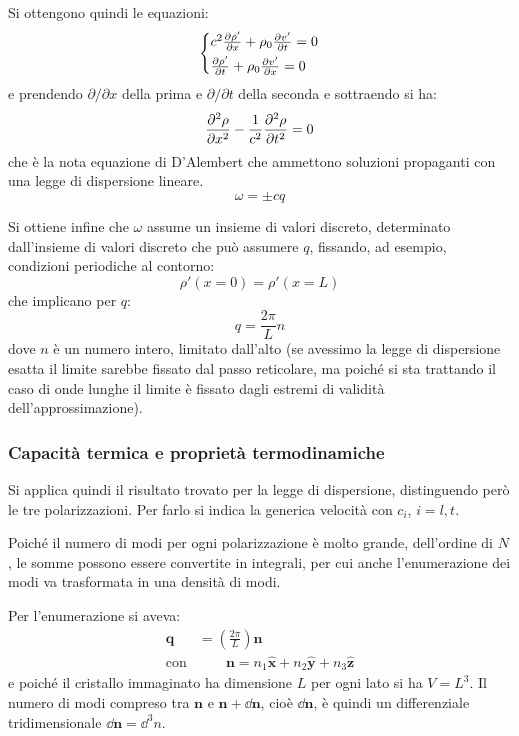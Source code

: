 Si ottengono quindi le equazioni:
\begin{equation*}
\begin{cases*}
c^2\partdev{\rho'}{x} + \rho_0 \partdev{v'}{t} = 0\\
\partdev{\rho'}{t} + \rho_0 \partdev{v'}{x} = 0
\end{cases*}
\end{equation*}
e prendendo $ \partial/\partial x $ della prima e $ \partial/\partial t $ della seconda e sottraendo si ha:
\begin{equation*}
	\frac{\partial {^2\rho}}{\partial {x^2}} - \frac{1}{c^2} \frac{\partial {^2\rho}}{\partial {t^2}} = 0
\end{equation*}
che è la nota equazione di D'Alembert che ammettono soluzioni propaganti con una legge di dispersione lineare.
\begin{equation*}
	\omega = \pm c q
\end{equation*}

Si ottiene infine che $ \omega $ assume un insieme di valori discreto, determinato dall'insieme di valori discreto che può assumere $ q $, fissando, ad esempio, condizioni periodiche al contorno:
\begin{equation*}
	\rho'(x=0) = \rho'(x=L)
\end{equation*}
che implicano per $ q $:
\begin{equation*}
	q = \frac{2\pi}{L}n
\end{equation*}
dove $ n $ è un numero intero, limitato dall'alto (se avessimo la legge di dispersione esatta il limite sarebbe fissato dal passo reticolare, ma poiché si sta trattando il caso di onde lunghe il limite è fissato dagli estremi di validità  dell'approssimazione).

\subsubsection{Capacità termica e proprietà termodinamiche}

Si applica quindi il risultato trovato per la legge di dispersione, distinguendo però le tre polarizzazioni. Per farlo si indica la generica velocità con $ c_i $, $ i = l,t $.
\newline

Poiché il numero di modi per ogni polarizzazione è molto grande, dell'ordine di $ N $, le somme possono essere convertite in integrali, per cui anche l'enumerazione dei modi va trasformata in una densità di modi.

Per l'enumerazione si aveva:
\begin{align*}
	\textbf{q} &= \left(\frac{2\pi}{L}\right) \textbf{n}\\
	\text{con} &\qquad \textbf{n} = n_1 \hat{\textbf{x}} + n_2 \hat{\textbf{y}} + n_3 \hat{\textbf{z}}
\end{align*}
e poiché il cristallo immaginato ha dimensione $ L $ per ogni lato si ha $ V = L^3 $. Il numero di modi compreso tra $ \textbf{n} $ e $ \textbf{n} + \dd \textbf{n} $, cioè $ \dd \textbf{n} $, è quindi un differenziale tridimensionale $ \dd \textbf{n} = \dd^3 n $.

